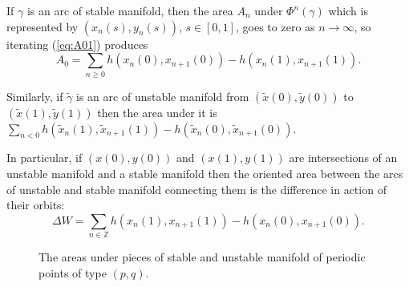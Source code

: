 \documentclass[12pt]{article}
\newcommand{\Z}{\mathbb{Z}}
\begin{document}
If $\gamma$ is an arc of stable manifold, then the area $A_n$ under $\Phi^n(\gamma)$  which is represented by $(x_n(s),y_n(s))$, $s\in[0,1]$, goes to zero as $n \to \infty$, so iterating (\ref{eq:A01}) produces
\begin{equation}
A_0 = \sum_{n\ge 0} h(x_n(0),x_{n+1}(0))-h(x_n(1),x_{n+1}(1)).
\label{eq:Ws}
\end{equation}

Similarly, if $\tilde{\gamma}$ is an arc of unstable manifold from $(\tilde{x}(0),\tilde{y}(0))$ to $(\tilde{x}(1),\tilde{y}(1))$ then the area under it is $\sum_{n<0} h(\tilde{x}_n(1),\tilde{x}_{n+1}(1))-h(\tilde{x}_n(0),\tilde{x}_{n+1}(0))$.

In particular, if $(x(0),y(0))$ and $(x(1),y(1))$ are intersections of an unstable manifold and a stable manifold then the oriented area between the arcs of unstable and stable manifold connecting them is the difference in action of their orbits:
\begin{equation}
\Delta W = \sum_{n\in \Z} h(x_n(1),x_{n+1}(1))-h(x_n(0),x_{n+1}(0)).
\label{eq:DW}
\end{equation}

\begin{figure}[htbp] %
   \centering



   \caption{The areas under pieces of stable and unstable manifold of periodic points of type $(p,q)$.}
   \label{fig:areaWsu}
\end{figure}
\end{document}
